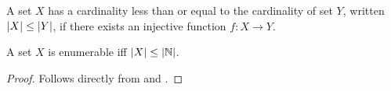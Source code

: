 \begin{definition} \label{def:card-leq} A set $X$ has a cardinality less than
or equal to the cardinality of set $Y$, written $\mathopen{}\left|{X}\right|\mathclose{}\leq\mathopen{}\left|{Y}\right|\mathclose{}$, if
there exists an injective function $f:X\rightarrow Y$. \end{definition}

\begin{theorem}\label{thm:card-enumerable} A set $X$ is enumerable iff
$\mathopen{}\left|{X}\right|\mathclose{}\leq\mathopen{}\left|{\mathbb{N}}\right|\mathclose{}$.  \end{theorem}

\begin{proof} Follows directly from  and .
\end{proof}


















